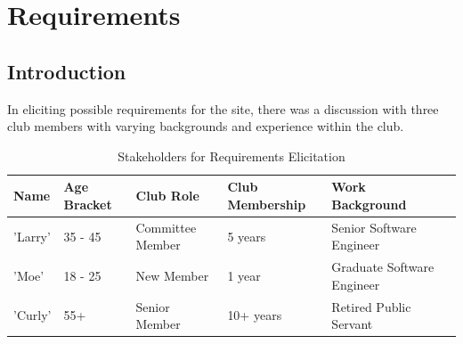 \chapter{Requirements}
\label{requirements}

\section{Introduction}

In eliciting possible requirements for the site, there was a discussion with three club members with varying backgrounds and experience within the club.

\begin{table}[H]
\caption{Stakeholders for Requirements Elicitation}
\begin{center}
    \begin{tabular}{ | l | l | l | l | l| p{5cm} |}
    \hline
    Name & Age Bracket & Club Role & Club Membership & Work Background \\ \hline
	'Larry' & 35 - 45& Committee Member & 5 years & Senior Software Engineer \\ \hline
	'Moe' & 18 - 25 & New Member & 1 year & Graduate Software Engineer \\ \hline
	'Curly' & 55+ & Senior Member & 10+ years & Retired Public Servant \\ \hline
    \end{tabular}
\end{center}
\label{fig:userelicit}
\end{table}



